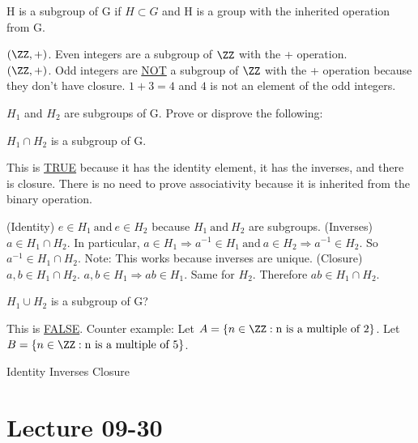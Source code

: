 \documentclass[11pt]{scrartcl}
\begin{document}
\begin{definition}
  H is a subgroup of G if $H \subset G$ and H is a group with the inherited operation from G.
\end{definition}

\begin{example}
  $(\ZZ, +)$. Even integers are a subgroup of $\ZZ$ with the + operation. \\
  $(\ZZ, +)$. Odd integers are \ul{NOT} a subgroup of $\ZZ$ with the + operation because they don't have closure. $1 + 3 = 4$ and $4$ is not an element of the odd integers.
\end{example}

\begin{exercise}
  $H_1$ and $H_2$ are subgroups of G. Prove or disprove the following:
  \begin{enumerate}
    \ii $H_1 \cap H_2$ is a subgroup of G.

    This is \ul{TRUE} because it has the identity element, it has the inverses, and there is closure. There is no need to prove associativity because it is inherited from the binary operation.
    \begin{enumerate}
      \ii (Identity)
      $e \in H_1 \ \text{and} \ e \in H_2$ because $H_1 \ \text{and} \ H_2$ are subgroups.
      \ii (Inverses)
      $a \in H_1 \cap H_2$. In particular, $a \in H_1 \Rightarrow a^{-1} \in H_1 \ \text{and} \ a \in H_2 \Rightarrow a^{-1} \in H_2$. So $a^{-1} \in H_1 \cap H_2$. Note: This works because inverses are unique.
      \ii (Closure)
      $a, b \in H_1 \cap H_2$. $a, b \in H_1 \Rightarrow ab \in H_1$. Same for $H_2$. Therefore $ab \in H_1 \cap H_2$.
    \end{enumerate}
    \ii $H_1 \cup H_2$ is a subgroup of G? 

    This is \ul{FALSE}. Counter example: Let $A = \{n \in \ZZ: \text{n is a multiple of 2}\}$. Let $B = \{n \in \ZZ: \text{n is a multiple of 5}\}$. 
    \begin{enumerate}
      \ii
      Identity \cmark
      \ii
      Inverses \cmark
      \ii
      Closure \xmark
    \end{enumerate}

  \end{enumerate}
\end{exercise}


\section{Lecture 09-30}
\end{document}
